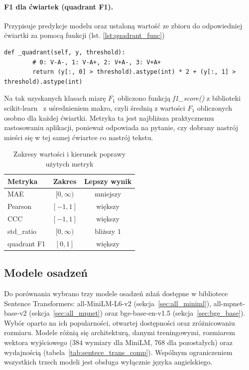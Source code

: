 \paragraph{F1 dla ćwiartek (quadrant F1).}
Przypisuje predykcje modelu oraz ustaloną wartość ze zbioru do odpowiedniej ćwiartki za pomocą 
funkcji (lst. \ref{lst:quadrant_func})
\begin{lstlisting}[style=pythonStyle, gobble=4,
                   caption={Definicja funkcji zmieniającej ciągłą predykcję na ćwiartkę},
                   label={lst:quadrant_func}]
    def _quadrant(self, y, threshold):
        # 0: V-A-, 1: V-A+, 2: V+A-, 3: V+A+
        return (y[:, 0] > threshold).astype(int) * 2 + (y[:, 1] > threshold).astype(int)
\end{lstlisting}
Na tak uzyskanych klasach miarę $F_1$ obliczono funkcją \textit{f1\_score()}
z biblioteki scikit-learn~\cite{f1_score} z uśrednieniem makro, czyli średnią
z wartości $F_1$ obliczonych osobno dla każdej ćwiartki. Metryka ta jest
najbliższa praktycznemu zastosowaniu aplikacji, ponieważ odpowiada na pytanie,
czy dobrany nastrój mieści się w tej samej ćwiartce co nastrój tekstu.
\begin{table}[htbp]
  \centering
  \caption{Zakresy wartości i kierunek poprawy użytych metryk}
  \label{tab:metrics_summary}
  \begin{tabular}{lcc}
    \toprule
    \textbf{Metryka} & \textbf{Zakres} & \textbf{Lepszy wynik} \\
    \midrule
    MAE & $[0, \infty)$ & mniejszy \\
    Pearson & $[-1, 1]$ & większy \\
    CCC & $[-1, 1]$ & większy \\
    std\_ratio & $[0, \infty)$ & bliższy $1$ \\
    quadrant F1 & $[0, 1]$ & większy \\
    \bottomrule
  \end{tabular}
\end{table}


\subsection{Modele osadzeń}
Do porównania wybrano trzy modele osadzeń zdań dostępne w bibliotece
Sentence Transformers: all-MiniLM-L6-v2 (sekcja~\ref{sec:all_miniml}),
all-mpnet-base-v2 (sekcja~\ref{sec:all_mpnet}) oraz bge-base-en-v1.5
(sekcja~\ref{sec:bge_base}). Wybór oparto na ich popularności, otwartej
dostępności oraz zróżnicowaniu rozmiaru. Modele różnią się architekturą, danymi treningowymi, 
rozmiarem wektora wyjściowego ($384$ wymiary dla MiniLM, $768$ dla pozostałych) oraz
wydajnością (tabela~\ref{tab:sentece_trans_comp}). Wspólnym ograniczeniem
wszystkich trzech modeli jest obsługa wyłącznie języka angielskiego.

